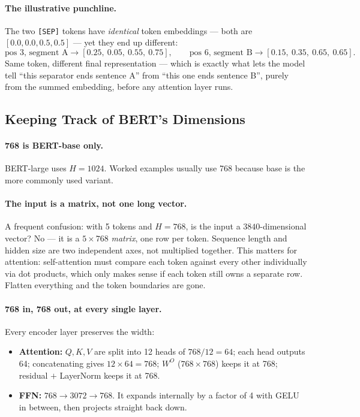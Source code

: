\documentclass[11pt,a4paper]{article}
\begin{document}
\paragraph{The illustrative punchline.} The two \texttt{[SEP]} tokens have \emph{identical}
token embeddings --- both are $[0.0, 0.0, 0.5, 0.5]$ --- yet they end up different:
\[
\text{pos 3, segment A} \rightarrow [0.25,\ 0.05,\ 0.55,\ 0.75], \qquad
\text{pos 6, segment B} \rightarrow [0.15,\ 0.35,\ 0.65,\ 0.65].
\]
Same token, different final representation --- which is exactly what lets the model tell
``this separator ends sentence A'' from ``this one ends sentence B'', purely from the summed
embedding, before any attention layer runs.

\subsection{Keeping Track of BERT's Dimensions}

\paragraph{768 is BERT-base only.} BERT-large uses $H = 1024$. Worked examples usually use 768
because base is the more commonly used variant.

\paragraph{The input is a matrix, not one long vector.} A frequent confusion: with 5 tokens
and $H = 768$, is the input a $3840$-dimensional vector? No --- it is a $5 \times 768$
\emph{matrix}, one row per token. Sequence length and hidden size are two independent axes,
not multiplied together. This matters for attention: self-attention must compare each token
against every other individually via dot products, which only makes sense if each token still
owns a separate row. Flatten everything and the token boundaries are gone.

\paragraph{768 in, 768 out, at every single layer.} Every encoder layer preserves the width:
\begin{itemize}
\item \textbf{Attention:} $Q, K, V$ are split into 12 heads of $768/12 = 64$; each head
  outputs 64; concatenating gives $12 \times 64 = 768$; $W^O$ ($768 \times 768$) keeps it at
  768; residual $+$ LayerNorm keeps it at 768.
\item \textbf{FFN:} $768 \rightarrow 3072 \rightarrow 768$. It expands internally by a factor
  of 4 with GELU in between, then projects straight back down.
\end{itemize}
\end{document}
